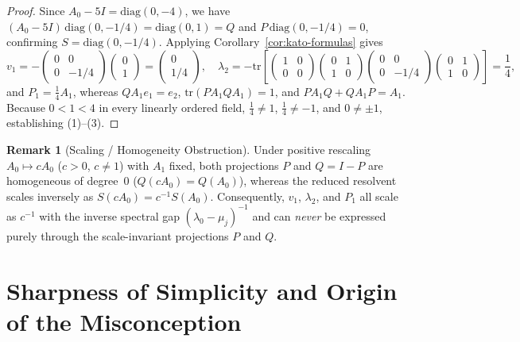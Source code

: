 \documentclass[11pt,a4paper]{article}
\theoremstyle{definition}
\newtheorem{remark}[theorem]{Remark}
\newcommand{\tr}{\mathrm{tr}}
\newcommand{\diag}{\mathrm{diag}}
\begin{document}
\begin{proof}
Since $A_0 - 5I = \diag(0, -4)$, we have $(A_0 - 5I)\,\diag(0, -1/4) = \diag(0, 1) = Q$
and $P\,\diag(0, -1/4) = 0$, confirming $S = \diag(0, -1/4)$. Applying
Corollary~\ref{cor:kato-formulas} gives
\[
  v_1 = -\begin{pmatrix} 0 & 0 \\ 0 & -1/4 \end{pmatrix}\begin{pmatrix} 0 \\ 1 \end{pmatrix}
  = \begin{pmatrix} 0 \\ 1/4 \end{pmatrix}, \quad
  \lambda_2 = -\tr\!\left[
    \begin{pmatrix} 1 & 0 \\ 0 & 0 \end{pmatrix}
    \begin{pmatrix} 0 & 1 \\ 1 & 0 \end{pmatrix}
    \begin{pmatrix} 0 & 0 \\ 0 & -1/4 \end{pmatrix}
    \begin{pmatrix} 0 & 1 \\ 1 & 0 \end{pmatrix}
  \right] = \frac{1}{4},
\]
and $P_1 = \frac{1}{4} A_1$, whereas $Q A_1 e_1 = e_2$, $\tr(P A_1 Q A_1) = 1$, and
$P A_1 Q + Q A_1 P = A_1$. Because $0 < 1 < 4$ in every linearly ordered field,
$\frac{1}{4} \neq 1$, $\frac{1}{4} \neq -1$, and $0 \neq \pm 1$, establishing (1)--(3).
\end{proof}

\begin{remark}[Scaling / Homogeneity Obstruction]\label{rem:scaling}
Under positive rescaling $A_0 \mapsto c A_0$ ($c > 0$, $c \neq 1$) with $A_1$ fixed,
both projections $P$ and $Q = I - P$ are homogeneous of degree~$0$
($Q(c A_0) = Q(A_0)$), whereas the reduced resolvent scales inversely as
$S(c A_0) = c^{-1} S(A_0)$. Consequently, $v_1$, $\lambda_2$, and $P_1$ all scale as
$c^{-1}$ with the inverse spectral gap $(\lambda_0 - \mu_j)^{-1}$ and can \emph{never}
be expressed purely through the scale-invariant projections $P$ and $Q$.
\end{remark}

\section{Sharpness of Simplicity and Origin of the Misconception}
\end{document}
